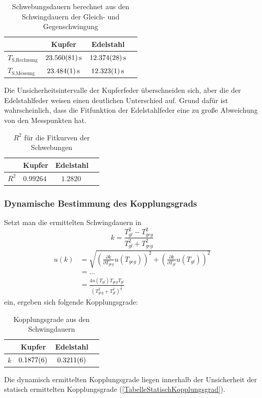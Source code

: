 \documentclass[
	a4paper,
	12pt,
	pagesize,
	ngerman
]{scrartcl}
\begin{document}
	\begin{table}[H]
	\centering
	\begin{tabular}{ l | c | c | c |}
		& Kupfer & Edelstahl  \\ \hline
		$T_\text{S,Rechnung}$ &$\SI{23,560 \pm 0,081}{s}$&$\SI{12,374 \pm 0,028}{s}$\\  \hline
		$T_\text{S,Messung} $ &$\SI{23,484 \pm 0,001}{s}$&$\SI{12,323 \pm 0,001}{s}$\\  \hline
	\end{tabular}
	\caption{Schwebungsdauern berechnet aus den Schwingdauern der Gleich- und Gegenschwingung}
	\end{table}
	Die Unsicherheitsintervalle der Kupferfeder überschneiden sich, aber die der Edelstahlfeder weisen einen deutlichen Unterschied auf. Grund dafür ist wahrscheinlich, dass die Fitfunktion der Edelstahlfeder eine zu große Abweichung von den Messpunkten hat.
	\begin{table}[H]
	\centering
	\begin{tabular}{ l | c | c | c |}
		& Kupfer & Edelstahl  \\ \hline
		$R^2$ &$\SI{0,99264}{}$&$\SI{1,2820}{}$\\  \hline
	\end{tabular}
	\caption{$R^2$ für die Fitkurven der Schwebungen}
	\end{table}

	\subsubsection{Dynamische Bestimmung des Kopplungsgrads}
	Setzt man die ermittelten Schwingdauern in
	\begin{equation}
		k = \frac{T_{gl}^2-T_{geg}^2}{T_{gl}^2+T_{geg}^2}
	\end{equation}
	\begin{align}
		u(k) &= \sqrt{\left(\frac{\partial k}{\partial T_{geg}}u(T_{geg}) \right)^2 + \left(\frac{\partial k}{\partial T_{gl}}u(T_{gl}) \right)^2 } \\
		&=                         ...\\
		&= \frac{4u(T_{gl})T_{geg}T_{gl}}{(T_{geg}^2+T_{gl}^2)^\frac{3}{2}}
	\end{align}
	ein, ergeben sich folgende Kopplungsgrade:
	\begin{table}[H]
	\centering
	\begin{tabular}{ l | c | c | c |}
		& Kupfer & Edelstahl  \\ \hline
		$k$ &$\SI{0,1877 \pm 0,0006}{}$&$\SI{0,3211 \pm 0,0006}{}$\\  \hline
	\end{tabular}
	\caption{Kopplungsgrade aus den Schwingdauern}
	\end{table}
	\noindent{}Die dynamisch ermittelten Kopplungsgrade liegen innerhalb der Unsicherheit der statisch ermittelten Kopplungsgrade (\cref{TabelleStatischKopplungsgrad}).
\end{document}
